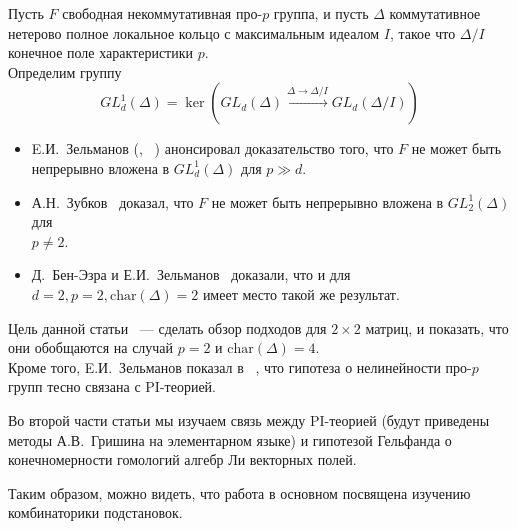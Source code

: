 \noindent
Пусть $F$ свободная некоммутативная про-$p$ группа, и пусть $\Delta$ коммутативное нетерово полное локальное кольцо с максимальным идеалом $I$, такое что
$\Delta/I$ конечное поле характеристики $p$.\\
Определим группу
\[GL_d^1(\Delta) = \ker\left( GL_d(\Delta) \xrightarrow{\Delta\to\Delta/I} GL_d(\Delta/I) \right)\]
\begin{itemize}
    \item E.И.\ Зельманов (\cite{Zelmanov1}, ~\cite{Zelmanov2}) анонсировал доказательство того, что $F$ не может быть непрерывно вложена в $GL_d^1(\Delta)$ для $p\gg d$.
    \item А.Н.\ Зубков~\cite{Zubkov} доказал, что $F$ не может быть непрерывно вложена в $GL_2^1(\Delta)$ для\\$p\neq2$.
    \item Д.\ Бен-Эзра и Е.И.\ Зельманов~\cite{Ben-Ezra-Zelmanov} доказали, что и для\\$d=2, p=2, \mathrm{char}(\Delta)=2$ имеет место такой же результат.
\end{itemize}

Цель данной статьи ~--- сделать обзор подходов для $2\times2$ матриц, и показать, что они обобщаются на случай $p=2$ и $\mathrm{char}(\Delta)=4$.\\
Кроме того, E.И.\ Зельманов показал в ~\cite{Zelmanov1}, что гипотеза о нелинейности про-$p$ групп тесно связана с PI-теорией.

Во второй части статьи мы изучаем связь между PI-теорией (будут приведены методы А.В.\ Гришина на элементарном языке)
и гипотезой Гельфанда о конечномерности гомологий алгебр Ли векторных полей.

Таким образом, можно видеть, что работа в основном посвящена изучению комбинаторики подстановок.
